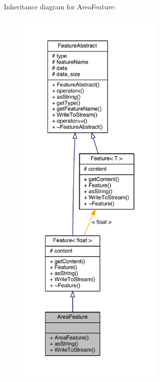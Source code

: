 Inheritance diagram for Area\+Feature\+:\nopagebreak
\begin{figure}[H]
\begin{center}
\leavevmode
\includegraphics[height=550pt]{class_area_feature__inherit__graph}
\end{center}
\end{figure}


